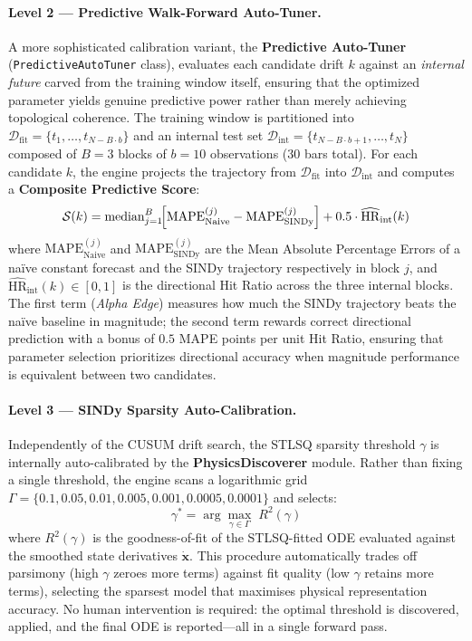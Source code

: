 \documentclass[11pt,a4paper]{article}
\begin{document}
\paragraph{Level 2 --- Predictive Walk-Forward Auto-Tuner.}
A more sophisticated calibration variant, the \textbf{Predictive Auto-Tuner} (\texttt{PredictiveAutoTuner} class), evaluates each candidate drift $k$ against an \textit{internal future} carved from the training window itself, ensuring that the optimized parameter yields genuine predictive power rather than merely achieving topological coherence. The training window is partitioned into $\mathcal{D}_{\text{fit}} = \{t_1, \ldots, t_{N - B \cdot b}\}$ and an internal test set $\mathcal{D}_{\text{int}} = \{t_{N-B\cdot b+1}, \ldots, t_N\}$ composed of $B = 3$ blocks of $b = 10$ observations (30 bars total). For each candidate $k$, the engine projects the trajectory from $\mathcal{D}_{\text{fit}}$ into $\mathcal{D}_{\text{int}}$ and computes a \textbf{Composite Predictive Score}:
\begin{equation}
    \mathcal{S}(k) = \operatorname{median}_{j=1}^{B}\!\Bigl[\mathrm{MAPE}^{(j)}_{\text{Naive}} - \mathrm{MAPE}^{(j)}_{\text{SINDy}}\Bigr] + 0.5 \cdot \widehat{\mathrm{HR}}_{\text{int}}(k)
    \label{eq:predictive_score}
\end{equation}
where $\mathrm{MAPE}^{(j)}_{\text{Naive}}$ and $\mathrm{MAPE}^{(j)}_{\text{SINDy}}$ are the Mean Absolute Percentage Errors of a na\"ive constant forecast and the SINDy trajectory respectively in block $j$, and $\widehat{\mathrm{HR}}_{\text{int}}(k) \in [0,1]$ is the directional Hit Ratio across the three internal blocks. The first term (\textit{Alpha Edge}) measures how much the SINDy trajectory beats the na\"ive baseline in magnitude; the second term rewards correct directional prediction with a bonus of $0.5$ MAPE points per unit Hit Ratio, ensuring that parameter selection prioritizes directional accuracy when magnitude performance is equivalent between two candidates.

\paragraph{Level 3 --- SINDy Sparsity Auto-Calibration.}
Independently of the CUSUM drift search, the STLSQ sparsity threshold $\gamma$ is internally auto-calibrated by the \textbf{PhysicsDiscoverer} module. Rather than fixing a single threshold, the engine scans a logarithmic grid $\Gamma = \{0.1, 0.05, 0.01, 0.005, 0.001, 0.0005, 0.0001\}$ and selects:
\begin{equation}
    \gamma^* = \arg\max_{\gamma \in \Gamma}\; R^2(\gamma)
    \label{eq:sindy_threshold}
\end{equation}
where $R^2(\gamma)$ is the goodness-of-fit of the STLSQ-fitted ODE evaluated against the smoothed state derivatives $\dot{\mathbf{x}}$. This procedure automatically trades off parsimony (high $\gamma$ zeroes more terms) against fit quality (low $\gamma$ retains more terms), selecting the sparsest model that maximises physical representation accuracy. No human intervention is required: the optimal threshold is discovered, applied, and the final ODE is reported---all in a single forward pass.
\end{document}
